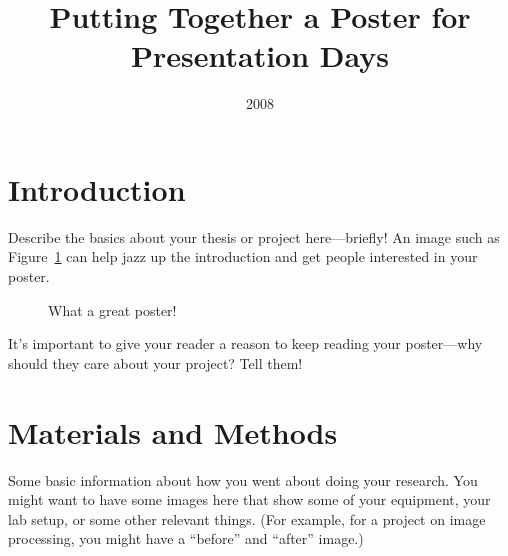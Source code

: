 \documentclass{hmcclinicposter}
\date{2008}
\title{Putting Together a Poster for Presentation Days}
\begin{document}
\begin{poster}

\section{Introduction}

Describe the basics about your thesis or project here---briefly!  An
image such as Figure~\ref{fig:our-poster} can help jazz up the
introduction and get people interested in your poster.

\begin{figure}
\begin{center}
\caption{What a great poster!}%
\label{fig:our-poster}
\end{center}
\end{figure}

It's important to give your reader a reason to keep reading your
poster---why should they care about your project?  Tell them!


\section{Materials and Methods}%

Some basic information about how you went about doing your
research.  You might want to have some images here that show some of
your equipment, your lab setup, or some other relevant things.  (For
example, for a project on image processing, you might have a
``before'' and ``after'' image.)


\end{poster}
\end{document}
